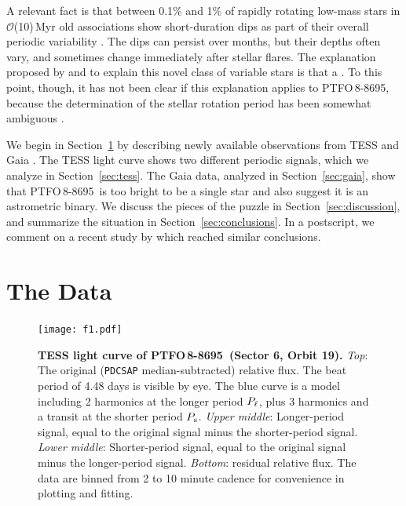\documentclass[12pt,twocolumn,tighten,trackchanges]{aastex62}
\newcommand{\ptfo}{PTFO$\,$8-8695}
\begin{document}
A relevant fact is that between 0.1\% and 1\% of rapidly rotating
low-mass stars in $\mathcal{O}$(10)$\,$Myr old associations show
short-duration dips as part of their overall periodic variability
\citep{rebull_usco_2018}.  The dips can persist over months, but their
depths often vary, and sometimes change immediately after stellar
flares.  The explanation proposed by \citet{stauffer_orbiting_2017}
and \citet{david_transient_2017} to explain this novel class of
variable stars is that a .  To this point, though,
it has not been clear if this explanation applies to \ptfo, because
the determination of the stellar rotation period has been somewhat
ambiguous
\citep{van_eyken_ptf_2012,koen_multicolour_2015,raetz_yeti_2016}.

We begin in Section~\ref{sec:observations} by describing newly
available observations from TESS \citep{ricker_transiting_2015} and
Gaia \citep{gaia_collaboration_gaia_2018}.  The TESS light curve shows
two different periodic signals, which we analyze in
Section~\ref{sec:tess}.  The Gaia data, analyzed in
Section~\ref{sec:gaia}, show that \ptfo\ is too bright to be a single
star and also suggest it is an astrometric binary.  We discuss the
pieces of the puzzle in Section~\ref{sec:discussion}, and summarize
the situation in Section~\ref{sec:conclusions}.  In a postscript, we
comment on a recent study by \citet{koen_2020} which reached similar
conclusions.


\section{The Data}
\label{sec:observations}

\begin{figure}[t!]
	\begin{center}
		\leavevmode
		\texttt{[image: f1.pdf]}
	\end{center}
	\vspace{-0.7cm}
	\caption{
    {\bf TESS light curve of \ptfo\ (Sector 6, Orbit 19).} {\it Top}:
    The original (\texttt{PDCSAP} median-subtracted) relative flux.
    The beat period of 4.48 days is visible by eye.  The blue curve is
    a model including 2 harmonics at the longer period $P_{\rm \ell}$,
    plus 3 harmonics and a transit at the shorter period $P_{\rm s}$.
    {\it Upper middle}: Longer-period signal, equal to the original
    signal minus the shorter-period signal.  {\it Lower middle}:
    Shorter-period signal, equal to the original signal minus the
    longer-period signal.  {\it Bottom}: residual relative flux.  The
    data are binned from 2 to 10 minute cadence for convenience in
    plotting and fitting.
		\label{fig:splitsignal}
	}
\end{figure}
\end{document}
